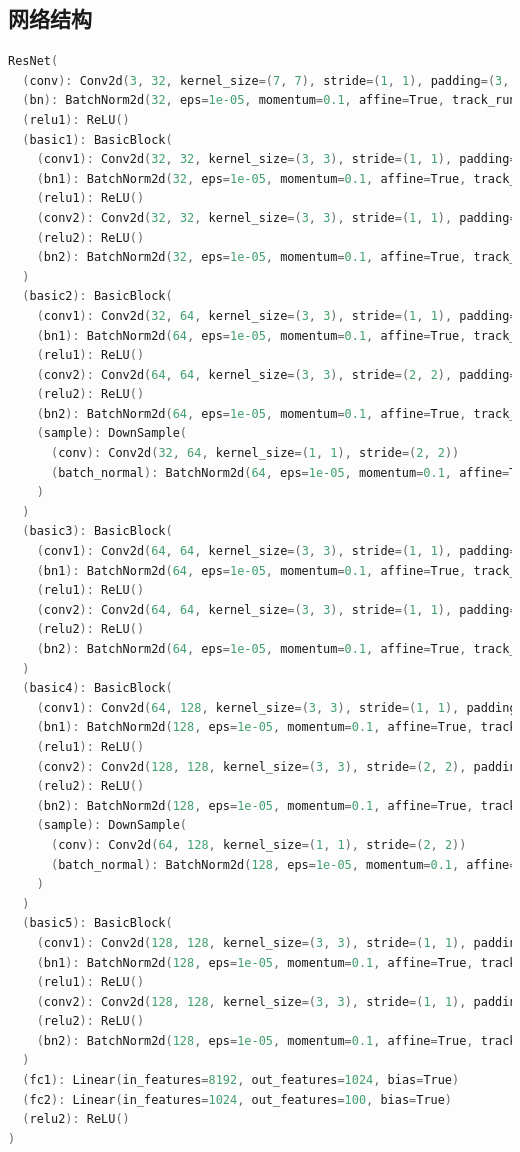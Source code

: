 \documentclass{article}
\begin{document}
\subsection{网络结构}
\begin{lstlisting}[language = C++]
ResNet(
  (conv): Conv2d(3, 32, kernel_size=(7, 7), stride=(1, 1), padding=(3, 3))
  (bn): BatchNorm2d(32, eps=1e-05, momentum=0.1, affine=True, track_running_stats=True)
  (relu1): ReLU()
  (basic1): BasicBlock(
    (conv1): Conv2d(32, 32, kernel_size=(3, 3), stride=(1, 1), padding=(1, 1))
    (bn1): BatchNorm2d(32, eps=1e-05, momentum=0.1, affine=True, track_running_stats=True)
    (relu1): ReLU()
    (conv2): Conv2d(32, 32, kernel_size=(3, 3), stride=(1, 1), padding=(1, 1))
    (relu2): ReLU()
    (bn2): BatchNorm2d(32, eps=1e-05, momentum=0.1, affine=True, track_running_stats=True)
  )
  (basic2): BasicBlock(
    (conv1): Conv2d(32, 64, kernel_size=(3, 3), stride=(1, 1), padding=(1, 1))
    (bn1): BatchNorm2d(64, eps=1e-05, momentum=0.1, affine=True, track_running_stats=True)
    (relu1): ReLU()
    (conv2): Conv2d(64, 64, kernel_size=(3, 3), stride=(2, 2), padding=(1, 1))
    (relu2): ReLU()
    (bn2): BatchNorm2d(64, eps=1e-05, momentum=0.1, affine=True, track_running_stats=True)
    (sample): DownSample(
      (conv): Conv2d(32, 64, kernel_size=(1, 1), stride=(2, 2))
      (batch_normal): BatchNorm2d(64, eps=1e-05, momentum=0.1, affine=True, track_running_stats=True)
    )
  )
  (basic3): BasicBlock(
    (conv1): Conv2d(64, 64, kernel_size=(3, 3), stride=(1, 1), padding=(1, 1))
    (bn1): BatchNorm2d(64, eps=1e-05, momentum=0.1, affine=True, track_running_stats=True)
    (relu1): ReLU()
    (conv2): Conv2d(64, 64, kernel_size=(3, 3), stride=(1, 1), padding=(1, 1))
    (relu2): ReLU()
    (bn2): BatchNorm2d(64, eps=1e-05, momentum=0.1, affine=True, track_running_stats=True)
  )
  (basic4): BasicBlock(
    (conv1): Conv2d(64, 128, kernel_size=(3, 3), stride=(1, 1), padding=(1, 1))
    (bn1): BatchNorm2d(128, eps=1e-05, momentum=0.1, affine=True, track_running_stats=True)
    (relu1): ReLU()
    (conv2): Conv2d(128, 128, kernel_size=(3, 3), stride=(2, 2), padding=(1, 1))
    (relu2): ReLU()
    (bn2): BatchNorm2d(128, eps=1e-05, momentum=0.1, affine=True, track_running_stats=True)
    (sample): DownSample(
      (conv): Conv2d(64, 128, kernel_size=(1, 1), stride=(2, 2))
      (batch_normal): BatchNorm2d(128, eps=1e-05, momentum=0.1, affine=True, track_running_stats=True)
    )
  )
  (basic5): BasicBlock(
    (conv1): Conv2d(128, 128, kernel_size=(3, 3), stride=(1, 1), padding=(1, 1))
    (bn1): BatchNorm2d(128, eps=1e-05, momentum=0.1, affine=True, track_running_stats=True)
    (relu1): ReLU()
    (conv2): Conv2d(128, 128, kernel_size=(3, 3), stride=(1, 1), padding=(1, 1))
    (relu2): ReLU()
    (bn2): BatchNorm2d(128, eps=1e-05, momentum=0.1, affine=True, track_running_stats=True)
  )
  (fc1): Linear(in_features=8192, out_features=1024, bias=True)
  (fc2): Linear(in_features=1024, out_features=100, bias=True)
  (relu2): ReLU()
)
\end{lstlisting}
\end{document}
